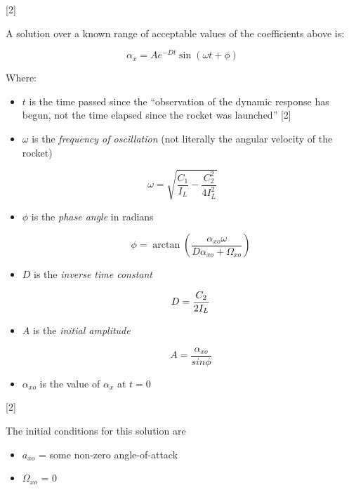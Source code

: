 \documentclass[]{article}
\providecommand{\tightlist}{%
  \setlength{\itemsep}{0pt}\setlength{\parskip}{0pt}}
\begin{document}
{[}2{]}

A solution over a known range of acceptable values of the coefficients
above is:

\begin{equation}
\label{eq_yaw_pitch_time_response}
\alpha_x = A e^{-Dt} \sin(\omega t + \phi)
\end{equation}

Where:

\begin{itemize}
\tightlist
\item
  \(t\) is the time passed since the ``observation of the dynamic
  response has begun, not the time elapsed since the rocket was
  launched'' {[}2{]}
\item
  \(\omega\) is the \emph{frequency of oscillation} (not literally the
  angular velocity of the rocket)
\end{itemize}

\begin{equation}
\label{eq_frequency_oscillation}
\omega = \sqrt{ \dfrac{C_1}{I_L} - \dfrac{C_2^2}{4 I_L^2} }
\end{equation}

\begin{itemize}
\tightlist
\item
  \(\phi\) is the \emph{phase angle} in radians

  \begin{equation}
  \label{eq_phase}
  \phi = 
  \arctan { 
  \left( \dfrac{ \alpha_{xo} \omega } { D\alpha_{xo} + \Omega_{xo} } \right) 
  }
  \end{equation}
\item
  \(D\) is the \emph{inverse time constant}

  \begin{equation}
  \label{eq_inverse_time_constant}
  D = { C_2 \over 2 I_L }
  \end{equation}
\item
  \(A\) is the \emph{initial amplitude}

  \begin{equation}
  A = \dfrac{\alpha_{xo}}{sin \phi}
  \end{equation}
\item
  \(\alpha_{xo}\) is the value of \(\alpha_x\) at \(t=0\)
\end{itemize}

{[}2{]}

The initial conditions for this solution are

\begin{itemize}
\tightlist
\item
  \(a_{xo}\) = some non-zero angle-of-attack
\item
  \(\Omega_{xo}\) = 0
\end{itemize}
\end{document}
